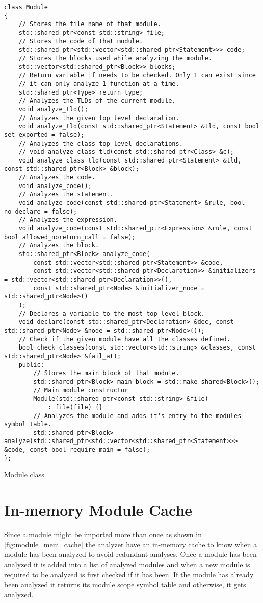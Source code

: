 \begin{code}
\begin{verbatim}
class Module
{
    // Stores the file name of that module.
    std::shared_ptr<const std::string> file;
    // Stores the code of that module.
    std::shared_ptr<std::vector<std::shared_ptr<Statement>>> code;
    // Stores the blocks used while analyzing the module.
    std::vector<std::shared_ptr<Block>> blocks;
    // Return variable if needs to be checked. Only 1 can exist since
    // it can only analyze 1 function at a time.
    std::shared_ptr<Type> return_type;
    // Analyzes the TLDs of the current module.
    void analyze_tld();
    // Analyzes the given top level declaration.
    void analyze_tld(const std::shared_ptr<Statement> &tld, const bool set_exported = false);
    // Analyzes the class top level declarations.
    // void analyze_class_tld(const std::shared_ptr<Class> &c);
    void analyze_class_tld(const std::shared_ptr<Statement> &tld, const std::shared_ptr<Block> &block);
    // Analyzes the code.
    void analyze_code();
    // Analyzes the statement.
    void analyze_code(const std::shared_ptr<Statement> &rule, bool no_declare = false);
    // Analyzes the expression.
    void analyze_code(const std::shared_ptr<Expression> &rule, const bool allowed_noreturn_call = false);
    // Analyzes the block.
    std::shared_ptr<Block> analyze_code(
        const std::vector<std::shared_ptr<Statement>> &code,
        const std::vector<std::shared_ptr<Declaration>> &initializers = std::vector<std::shared_ptr<Declaration>>(),
        const std::shared_ptr<Node> &initializer_node = std::shared_ptr<Node>()
    );
    // Declares a variable to the most top level block.
    void declare(const std::shared_ptr<Declaration> &dec, const std::shared_ptr<Node> &node = std::shared_ptr<Node>());
    // Check if the given module have all the classes defined.
    bool check_classes(const std::vector<std::string> &classes, const std::shared_ptr<Node> &fail_at);
    public:
        // Stores the main block of that module.
        std::shared_ptr<Block> main_block = std::make_shared<Block>();
        // Main module constructor
        Module(std::shared_ptr<const std::string> &file)
            : file(file) {}
        // Analyzes the module and adds it's entry to the modules symbol table.
        std::shared_ptr<Block> analyze(std::shared_ptr<std::vector<std::shared_ptr<Statement>>> &code, const bool require_main = false);
};
\end{verbatim}
\caption{Module class}
\label{ls:module_class}
\end{code}

\section{In-memory Module Cache}

Since a module might be imported more than once as shown in \autoref{fig:module_mem_cache} the analyzer
have an in-memory cache to know when a module has been analyzed to avoid redundant analyses.
Once a module has been analyzed it is added into a list of analyzed modules and when a new module is required to be
analyzed is first checked if it has been. If the module has already been analyzed it returns its module scope symbol table and otherwise, it gets analyzed.
